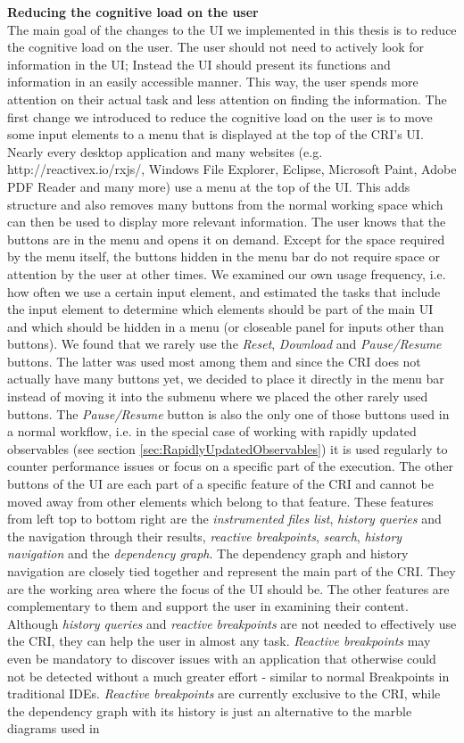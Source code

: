 \textbf{Reducing the cognitive load on the user}\\
The main goal of the changes to the UI we implemented in this thesis is to reduce the cognitive load on the user. The user should not need to actively look for information in the UI; Instead the UI should present its functions and information in an easily accessible manner. This way, the user spends more attention on their actual task and less attention on finding the information. The first change we introduced to reduce the cognitive load on the user is to move some input elements to a menu that is displayed at the top of the CRI's UI. Nearly every desktop application and many websites (e.g. http://reactivex.io/rxjs/, Windows File Explorer, Eclipse, Microsoft Paint, Adobe PDF Reader and many more) use a menu at the top of the UI. This adds structure and also removes many buttons from the normal working space which can then be used to display more relevant information. The user knows that the buttons are in the menu and opens it on demand. Except for the space required by the menu itself, the buttons hidden in the menu bar do not require space or attention by the user at other times. We examined our own usage frequency, i.e. how often we use a certain input element, and estimated the tasks that include the input element to determine which elements should be part of the main UI and which should be hidden in a menu (or closeable panel for inputs other than buttons). We found that we rarely use the \emph{Reset}, \emph{Download} and \emph{Pause/Resume} buttons. The latter was used most among them and since the CRI does not actually have many buttons yet, we decided to place it directly in the menu bar instead of moving it into the submenu where we placed the other rarely used buttons. The \emph{Pause/Resume} button is also the only one of those buttons used in a normal workflow, i.e. in the special case of working with rapidly updated observables (see section \ref{sec:RapidlyUpdatedObservables}) it is used regularly to counter performance issues or focus on a specific part of the execution. The other buttons of the UI are each part of a specific feature of the CRI and cannot be moved away from other elements which belong to that feature. These features from left top to bottom right are the \emph{instrumented files list}, \emph{history queries} and the navigation through their results, \emph{reactive breakpoints}, \emph{search}, \emph{history navigation} and the \emph{dependency graph}. The dependency graph and history navigation are closely tied together and represent the main part of the CRI. They are the working area where the focus of the UI should be. The other features are complementary to them and support the user in examining their content. Although \emph{history queries} and \emph{reactive breakpoints} are not needed to effectively use the CRI, they can help the user in almost any task. \emph{Reactive breakpoints} may even be mandatory to discover issues with an application that otherwise could not be detected without a much greater effort - similar to normal Breakpoints in traditional IDEs. \emph{Reactive breakpoints} are currently exclusive to the CRI, while the dependency graph with its history is just an alternative to the marble diagrams used in 